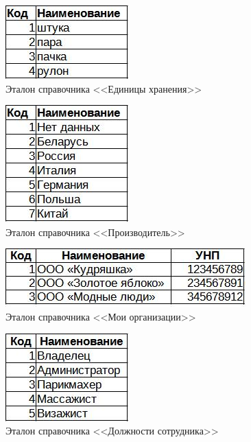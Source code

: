\begin{figure}[!h]
    \centering
    \includegraphics[]
        {_docs/СП_ЕдХран_эталон.jpg}
    \caption{Эталон справочника <<Единицы хранения>>}
    \label{fig:CP_EdHran_etalon}
\end{figure}

    \begin{figure}[!h]
        \centering
        \includegraphics[]
            {_docs/СП_Произв_эталон.jpg}
        \caption{Эталон справочника <<Производитель>>}
        \label{fig:CP_Proizv_etalon}
    \end{figure}

\begin{figure}[!h]
    \centering
    \includegraphics[]
        {_docs/СП_МоиОрг_эталон.jpg}
    \caption{Эталон справочника <<Мои организации>>}
    \label{fig:CP_MoiOrg_etalon}
\end{figure}

\begin{figure}[!h]
    \centering
    \includegraphics[]
        {_docs/СП_ДолжнСотр_эталон.jpg}
    \caption{Эталон справочника <<Должности сотрудника>>}
    \label{fig:CP_DoljSotr_etalon}
\end{figure}

